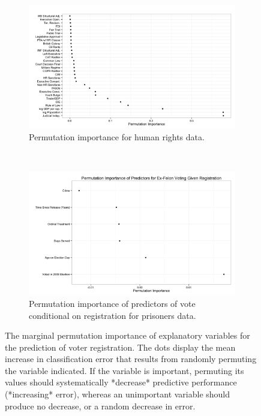 \begin{figure}
        \centering
        \begin{subfigure}[b]{0.5\textwidth}
                \includegraphics[width=\textwidth]{figures/latent_imp.png}
                \caption{Permutation importance for human rights data.}
                \label{fig:latent_imp}
        \end{subfigure}%
        ~ %
        \begin{subfigure}[b]{0.5\textwidth}
                \includegraphics[width=\textwidth]{figures/imp_cond_vote.png}
                \caption{Permutation importance of predictors of vote conditional on registration for prisoners data.}
                \label{fig:imp_cond_vote}
        \end{subfigure}
        \caption{The marginal permutation importance of explanatory variables for the prediction of voter registration. The dots display the mean increase in classification error that results from randomly permuting the variable indicated. If the variable is important, permuting its values should systematically *decrease* predictive performance (*increasing* error), whereas an unimportant variable should produce no decrease, or a random decrease in error.}
        \label{fig:imp}
\end{figure}
